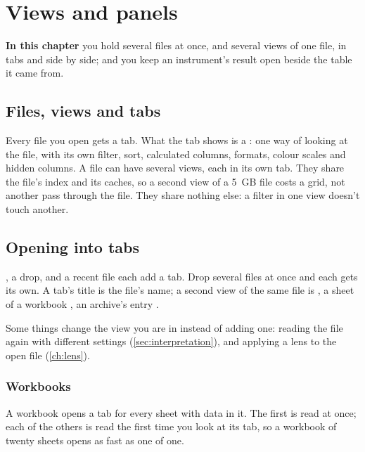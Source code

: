 \chapter{Views and panels}\label{ch:views}
\begin{goals}
\textbf{In this chapter} you hold several files at once, and several views of one file, in tabs and side
by side; and you keep an instrument's result open beside the table it came from.
\end{goals}

\section{Files, views and tabs}\label{sec:views}

Every file you open gets a tab. What the tab shows is a : one way of looking at the file, with
its own filter, sort, calculated columns, formats, colour scales and hidden columns. A file can have
several views, each in its own tab. They share the file's index and its caches, so a second view of a
5~GB file costs a grid, not another pass through the file. They share nothing else: a filter in one view
doesn't touch another.


\section{Opening into tabs}\label{sec:open-tabs}

, a drop, and a recent file each add a tab.
Drop several files at once and each gets its own. A tab's title is the file's name; a second view of the
same file is , a sheet of a workbook , an archive's entry
.

Some things change the view you are in instead of adding one: reading the file again with different
settings (\cref{sec:interpretation}), and applying a lens to the open file (\cref{ch:lens}).

\subsection{Workbooks}\label{sec:workbook-tabs}

A workbook opens a tab for every sheet with data in it. The first is read at once; each of the others is
read the first time you look at its tab, so a workbook of twenty sheets opens as fast as one of one.

